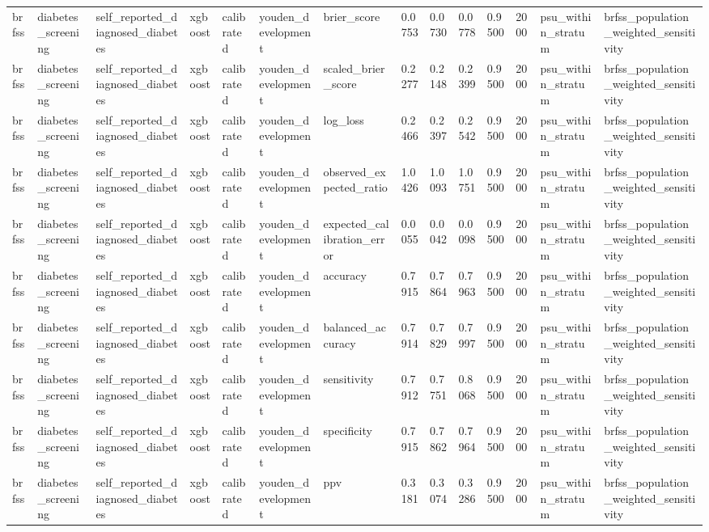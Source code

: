 \begin{tabular}{llllllllllllll}
brfss & diabetes\_screening & self\_reported\_diagnosed\_diabetes & xgboost & calibrated & youden\_development & brier\_score & 0.0753 & 0.0730 & 0.0778 & 0.9500 & 2000 & psu\_within\_stratum & brfss\_population\_weighted\_sensitivity \\
brfss & diabetes\_screening & self\_reported\_diagnosed\_diabetes & xgboost & calibrated & youden\_development & scaled\_brier\_score & 0.2277 & 0.2148 & 0.2399 & 0.9500 & 2000 & psu\_within\_stratum & brfss\_population\_weighted\_sensitivity \\
brfss & diabetes\_screening & self\_reported\_diagnosed\_diabetes & xgboost & calibrated & youden\_development & log\_loss & 0.2466 & 0.2397 & 0.2542 & 0.9500 & 2000 & psu\_within\_stratum & brfss\_population\_weighted\_sensitivity \\
brfss & diabetes\_screening & self\_reported\_diagnosed\_diabetes & xgboost & calibrated & youden\_development & observed\_expected\_ratio & 1.0426 & 1.0093 & 1.0751 & 0.9500 & 2000 & psu\_within\_stratum & brfss\_population\_weighted\_sensitivity \\
brfss & diabetes\_screening & self\_reported\_diagnosed\_diabetes & xgboost & calibrated & youden\_development & expected\_calibration\_error & 0.0055 & 0.0042 & 0.0098 & 0.9500 & 2000 & psu\_within\_stratum & brfss\_population\_weighted\_sensitivity \\
brfss & diabetes\_screening & self\_reported\_diagnosed\_diabetes & xgboost & calibrated & youden\_development & accuracy & 0.7915 & 0.7864 & 0.7963 & 0.9500 & 2000 & psu\_within\_stratum & brfss\_population\_weighted\_sensitivity \\
brfss & diabetes\_screening & self\_reported\_diagnosed\_diabetes & xgboost & calibrated & youden\_development & balanced\_accuracy & 0.7914 & 0.7829 & 0.7997 & 0.9500 & 2000 & psu\_within\_stratum & brfss\_population\_weighted\_sensitivity \\
brfss & diabetes\_screening & self\_reported\_diagnosed\_diabetes & xgboost & calibrated & youden\_development & sensitivity & 0.7912 & 0.7751 & 0.8068 & 0.9500 & 2000 & psu\_within\_stratum & brfss\_population\_weighted\_sensitivity \\
brfss & diabetes\_screening & self\_reported\_diagnosed\_diabetes & xgboost & calibrated & youden\_development & specificity & 0.7915 & 0.7862 & 0.7964 & 0.9500 & 2000 & psu\_within\_stratum & brfss\_population\_weighted\_sensitivity \\
brfss & diabetes\_screening & self\_reported\_diagnosed\_diabetes & xgboost & calibrated & youden\_development & ppv & 0.3181 & 0.3074 & 0.3286 & 0.9500 & 2000 & psu\_within\_stratum & brfss\_population\_weighted\_sensitivity \\

\end{tabular}
